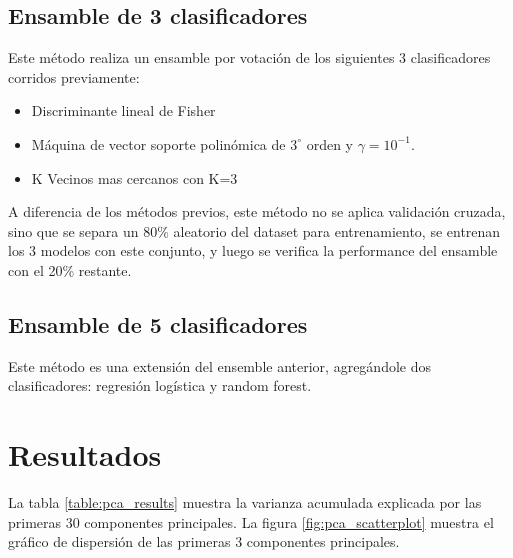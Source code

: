 \documentclass[journal]{IEEEtran}
\begin{document}
\subsection{Ensamble de 3 clasificadores}
Este método realiza un ensamble por votación de los siguientes 3
clasificadores corridos previamente:

\begin{itemize}
\item Discriminante lineal de Fisher
\item Máquina de vector soporte polinómica de $3^{\circ}$ orden y $\gamma=10^{-1}$. 
\item K Vecinos mas cercanos con K=3
\end{itemize}

A diferencia de los métodos previos, este método no se aplica
validación cruzada, sino que se separa un 80\% aleatorio del dataset para 
entrenamiento, se entrenan los 3 modelos con este conjunto, y luego
se verifica la performance del ensamble con el 20\% restante.

\subsection{Ensamble de 5 clasificadores}
Este método es una extensión del ensemble anterior, agregándole
dos clasificadores: regresión logística y random forest.

\section{Resultados}

La tabla \ref{table:pca_results} muestra la varianza acumulada explicada 
por las primeras 30 componentes principales. La figura \ref{fig:pca_scatterplot}
muestra el gráfico de dispersión de las primeras 3 componentes principales.
\end{document}
